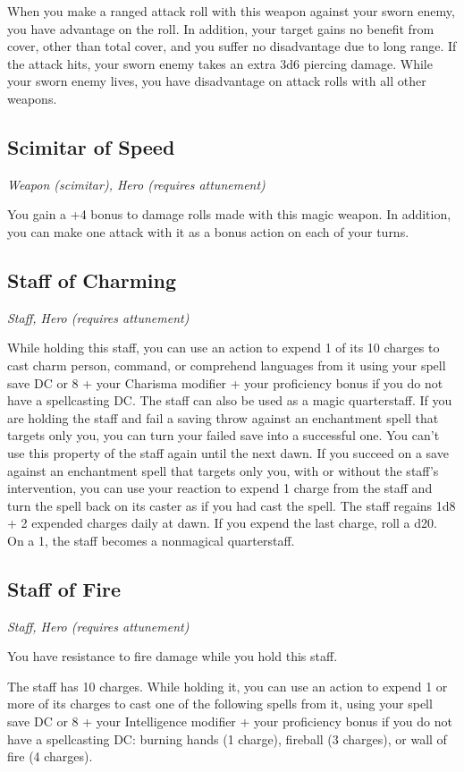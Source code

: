 When you make a ranged attack roll with this weapon against your sworn enemy, you have advantage on the roll. In addition, your target gains no benefit from cover, other than total cover, and you suffer no disadvantage due to long range. If the attack hits, your sworn enemy takes an extra 3d6 piercing damage. While your sworn enemy lives, you have disadvantage on attack rolls with all other weapons.

\subsection{Scimitar of Speed}
\textit{Weapon (scimitar), Hero (requires attunement)}

You gain a +4 bonus to damage rolls made with this magic weapon. In addition, you can make one attack with it as a bonus action on each of your turns.

\subsection{Staff of Charming}
\textit{Staff, Hero (requires attunement)} 

While holding this staff, you can use an action to expend 1 of its 10 charges to cast charm person, command, or comprehend languages from it using your spell save DC or 8 + your Charisma modifier + your proficiency bonus if you do not have a spellcasting DC. The staff can also be used as a magic quarterstaff. If you are holding the staff and fail a saving throw against an enchantment spell that targets only you, you can turn your failed save into a successful one. You can't use this property of the staff again until the next dawn. If you succeed on a save against an enchantment spell that targets only you, with or without the staff's intervention, you can use your reaction to expend 1 charge from the staff and turn the spell back on its caster as if you had cast the spell.  The staff regains 1d8 + 2 expended charges daily at dawn. If you expend the last charge, roll a d20. On a 1, the staff becomes a nonmagical quarterstaff.

\subsection{Staff of Fire}
\textit{Staff, Hero (requires attunement)}

You have resistance to fire damage while you hold this staff.

The staff has 10 charges. While holding it, you can use an action to expend 1 or more of its charges to cast one of the following spells from it, using your spell save DC or 8 + your Intelligence modifier + your proficiency bonus if you do not have a spellcasting DC: burning hands (1 charge), fireball (3 charges), or wall of fire (4 charges).

